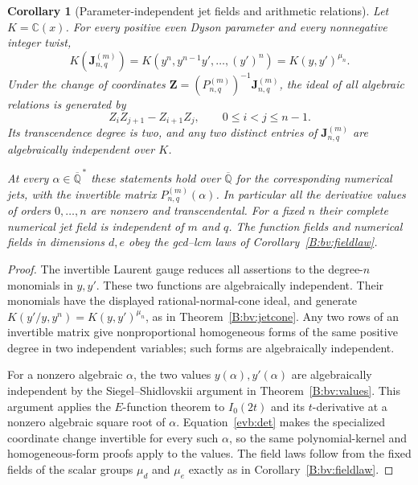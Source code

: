 \documentclass[11pt,a4paper]{article}
\newtheorem{corollary}[theorem]{Corollary}
\theoremstyle{definition}
\theoremstyle{remark}
\numberwithin{equation}{section}
\begin{document}
\begin{corollary}[Parameter-independent jet fields and arithmetic relations]
\label{evb:arithmetic}
Let $K=\mathbb C(x)$. For every positive even Dyson parameter and
every nonnegative integer twist,
\begin{equation}\label{evb:field}
 K(\mathbf J^{(m)}_{n,q})
   =K(y^n,y^{n-1}y',\ldots,(y')^n)
   =K(y,y')^{\mu_n}.
\end{equation}
Under the change of coordinates
$\mathbf Z=(P^{(m)}_{n,q})^{-1}\mathbf J^{(m)}_{n,q}$, the ideal of
all algebraic relations is generated by
\[
 Z_iZ_{j+1}-Z_{i+1}Z_j,
 \qquad 0\le i<j\le n-1.
\]
Its transcendence degree is two, and any two distinct entries of
$\mathbf J^{(m)}_{n,q}$ are algebraically independent over $K$.

At every $\alpha\in\overline{\mathbb Q}^{\,*}$ these statements
hold over $\overline{\mathbb Q}$ for the corresponding numerical
jets, with the invertible matrix $P^{(m)}_{n,q}(\alpha)$.
In particular all the derivative values of orders $0,\ldots,n$
are nonzero and transcendental. For a fixed $n$ their complete
numerical jet field is independent of $m$ and $q$.
The function fields and numerical fields in dimensions $d,e$
obey the gcd--lcm laws of Corollary~\ref{B:bv:fieldlaw}.
\end{corollary}

\begin{proof}
The invertible Laurent gauge reduces all assertions to the
degree-$n$ monomials in $y,y'$. These two functions are
algebraically independent. Their monomials have the displayed
rational-normal-cone ideal, and generate
$K(y'/y,y^n)=K(y,y')^{\mu_n}$, as in
Theorem~\ref{B:bv:jetcone}. Any two rows of an invertible matrix
give nonproportional homogeneous forms of the same positive
degree in two independent variables; such forms are
algebraically independent.

For a nonzero algebraic $\alpha$, the two values
$y(\alpha),y'(\alpha)$ are algebraically independent by the
Siegel--Shidlovskii argument in Theorem~\ref{B:bv:values}.
This argument applies the $E$-function theorem to $I_0(2t)$ and
its $t$-derivative at a nonzero algebraic square root of $\alpha$.
Equation~\eqref{evb:det} makes the specialized coordinate change
invertible for every such $\alpha$, so the same polynomial-kernel
and homogeneous-form proofs apply to the values. The field laws
follow from the fixed fields of the scalar groups $\mu_d$ and
$\mu_e$ exactly as in Corollary~\ref{B:bv:fieldlaw}.
\end{proof}
\end{document}
